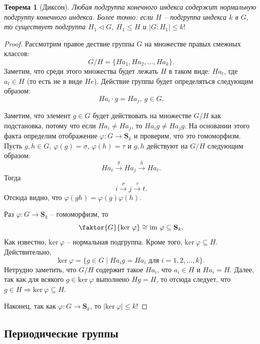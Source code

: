 \documentclass{article}
\newtheorem{theorem}{Теорема}[section]
\begin{document}
\begin{theorem}[Диксон] \label{djaios}
    Любая подгруппа конечного индекса содержит нормальную подгруппу конечного индекса.
    Более точно: если $H$ -- подгруппа индекса $k$ в $G$, то существует подгруппа $H_1 \triangleleft G$, $H_1 \leqslant H$ и $|G : H_1| \leqslant k!$
\end{theorem}
\begin{proof}
    Рассмотрим правое дествие группы $G$ на множестве правых смежных классов:
    \[
        G/H = \{ H a_1, H a_2, \ldots , H a_k \}.
    \]
    Заметим, что среди этого множества будет лежать $H$ в таком виде: $H a_t$, где $a_t \in H$ (то есть не в виде $H e$). 
    Действие группы будет определяться следующим образом:
    \[
        H a_i \cdot g = H a_j, \ g \in G.
    \]

    Заметим, что элемент $g \in G$ будет действовать на множестве $G/H$ как подстановка, потому что если $H a_i \neq H a_j$, то $H a_i g \neq H a_j g$.
    На основании этого факта определим отображение $\varphi: G \rightarrow \mathbf{S}_k$ и проверим, что это гомоморфизм.
    Пусть $g, h \in G$, $\varphi(g) = \sigma$, $\varphi(h) = \tau$ и $g,h$ действуют на $G/H$ следующим образом: $$ H a_i \xrightarrow{g} H a_j \xrightarrow{h} H a_t. $$
    Тогда
    \[
        i \xrightarrow{\sigma} j \xrightarrow{\tau} t.
    \]
    Отсюда видно, что $\varphi(gh) = \varphi(g) \varphi(h)$.

    Раз $\varphi: G \rightarrow \mathbf{S}_k$ -- гомоморфизм, то
    \[
        \faktor{G}{\textrm{ker} \ \varphi} \cong \textrm{im} \ \varphi \subseteq \mathbf{S}_k.
    \]
    Как известно, $\textrm{ker} \ \varphi$ -- нормальная подгруппа. Кроме того, $\textrm{ker} \ \varphi \subseteq H$. Действительно,
    \[
        \textrm{ker} \ \varphi = \{ g \in G \mid H a_i g = H a_i \text{ для } i=1,2,\ldots, k \}.
    \]
    Нетрудно заметить, что $G/H$ содержит такое $H a_i$, что $a_i \in H$ и $H a_i = H$. Далее, так как для всякого $g \in \textrm{ker} \ \varphi$ выполнено $H g = H$, то отсюда следует, что $g \in H \Rightarrow \textrm{ker} \ \varphi \subseteq H$.

    Наконец, так как $\varphi: G \rightarrow \mathbf{S}_k$, то $|\textrm{ker} \ \varphi| \leqslant k!$
\end{proof}

\subsection{Периодические группы}
\end{document}
